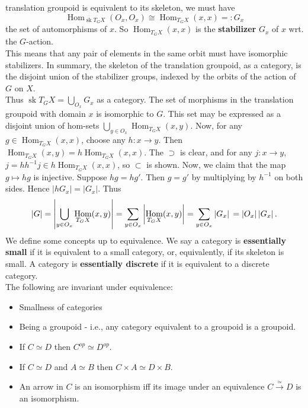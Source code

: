 \documentclass[a4paper]{article}
\theoremstyle{plain}%
\theoremstyle{definition}
\theoremstyle{remark}
\DeclareMathOperator{\Hom}{Hom}
\DeclareMathOperator{\sk}{sk}
\begin{document}
translation groupoid is equivalent to its skeleton, we must have
\[
\Hom_{\sk T_G X} \left( O_x, O_x \right) \cong
\Hom_{T_G X} (x,x) =: G_x
\] 
the set of automorphisms of $x$. So $\Hom_{T_G X}(x,x)$ is the
\textbf{stabilizer} $G_x$ of $x$ wrt. the $G$-action.\\
This means that any pair of elements in the same orbit must have isomorphic
stabilizers. In summary, the skeleton of the translation groupoid, as
a category, is the disjoint union of the stabilizer groups, indexed by the
orbits of the action of $G$ on $X$.\\
Thus $\sk T_G X = \bigcup_{O_x} G_x$ as a category.
The set of morphisms in the translation groupoid with domain $x$ is isomorphic
to $G$. This set may be expressed as a disjoint union of hom-sets
$\bigcup_{y \in O_x} \Hom_{T_GX}(x,y)$. Now, for any
$g \in \Hom_{T_G X}(x,x)$, choose any $h  \colon x \to y$. Then
$\Hom_{T_G X}(x,y) = h \Hom_{T_GX}(x,x)$. The $\supset$ is clear, and
for any $j  \colon x \to y$, $j = h h^{-1} j \in h \Hom_{T_G X}(x,x)$, so
$\subset $ is shown. Now, we claim that the map
$g \mapsto hg$ is injective. Suppose $hg = hg'$. Then
$g = g'$ by multiplying by $h^{-1}$ on both sides. Hence
$\left| h G_x \right| = \left| G_x \right| $. Thus
\[
\left| G \right| = 
\left| \bigcup_{y \in O_x}  \Hom_{T_G X}(x,y) \right| 
= \sum_{y \in O_x} \left| \Hom_{T_GX}(x,y) \right| 
= \sum_{y \in O_x} \left| G_x \right| \\
= \left| O_x \right| \left| G_x \right| .
\] 
We define some concepts up to equivalence. We say a category is
\textbf{essentially small} if it is equivalent to a small category, or,
equivalently, if its skeleton is small. A category is \textbf{essentially
discrete} if it is equivalent to a discrete category.\\
\linebreak
The following are invariant under equivalence:
\begin{itemize}
    \item Smallness of categories
    \item Being a groupoid - i.e., any category equivalent to a groupoid is
        a groupoid.
    \item If $C \simeq D$ then $C^{op} \simeq D^{op}$.
    \item If $C \simeq D$ and $A \simeq B$ then
        $C \times A \simeq D \times B$.
    \item An arrow in $C$ is an isomorphism iff its image under an equivalence
        $C \stackrel{\simeq}{\to } D$ is an isomorphism.
\end{itemize}
 
\end{document}
